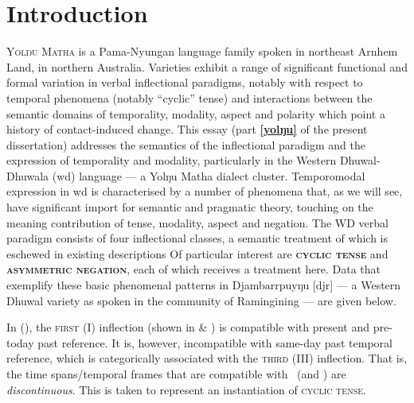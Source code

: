 
\setcounter{chapter}{0}%
\section*{Introduction}
\noindent\textsc{Yolŋu Matha} is a Pama-Nyungan language family spoken in northeast Arnhem Land, in northern Australia. Varieties exhibit a range of significant functional and formal variation in verbal inflectional paradigms, notably with respect to temporal phenomena  (notably “cyclic” tense) and interactions between the semantic domains of temporality, modality, aspect and polarity which point a history of contact-induced change. This essay (part \textbf{\ref{yolŋu}} of the present dissertation) addresses the semantics of the inflectional paradigm and the expression of temporality and modality, particularly in the Western Dhuwal-Dhuwala (\gls{wd}) language --- a Yolŋu Matha dialect cluster. Temporomodal expression in \gls{wd} is characterised by a number of phenomena that, as we will see, have significant import for semantic and pragmatic theory, touching on the meaning contribution of tense, modality, aspect and negation. The WD verbal paradigm consists of four inflectional classes, a semantic treatment of which is eschewed in existing descriptions \citetext{\textit{i.e.}, \citealp{Wilkinson1991,Lowe1996,VanderWal1992}, \textit{see also} \citealt{Waters1989}.} Of particular interest are \textbf{\textsc{cyclic tense}} and \textbf{\textsc{asymmetric negation}}, each of which receives a treatment here. Data that exemplify these basic phenomenal patterns in Djambarrpuyŋu [\gls{djr}] --- a Western Dhuwal variety as spoken in the community of Ramingining --- are given below.

In (), the \textsc{first} (\gls{I}) inflection (shown in \textit{} \& \textit{}) is compatible with present and pre-today past reference. It is, however, incompatible with same-day past temporal reference, which is categorically associated with the \textsc{third} (\gls{III}) inflection. That is, the time spans/temporal frames that are compatible with \I\ (and \III) are \textit{discontinuous}. This is taken to represent an instantiation of \textsc{cyclic tense}.


